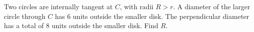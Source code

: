 Two circles are internally tangent at $C$, with radii $R>r$. A diameter of the larger circle through $C$ has 6 units outside the smaller disk. The perpendicular diameter has a total of 8 units outside the smaller disk. Find $R$.
